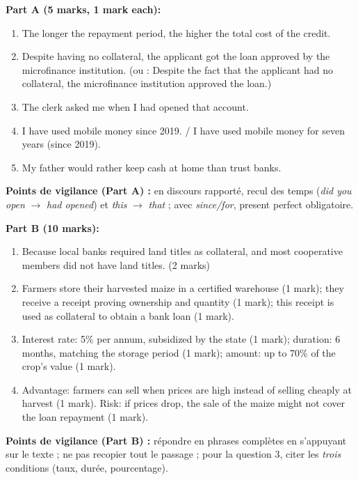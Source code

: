 \documentclass[11pt]{article}
\begin{document}
\begin{corrige}
\textbf{Part A (5 marks, 1 mark each):}
\begin{enumerate}
    \item The longer the repayment period, the higher the total cost of the credit.
    \item Despite having no collateral, the applicant got the loan approved by the microfinance institution. (ou : Despite the fact that the applicant had no collateral, the microfinance institution approved the loan.)
    \item The clerk asked me when I had opened that account.
    \item I have used mobile money since 2019. / I have used mobile money for seven years (since 2019).
    \item My father would rather keep cash at home than trust banks.
\end{enumerate}
\textbf{Points de vigilance (Part A) :} en discours rapporté, recul des temps (\emph{did you open} $\rightarrow$ \emph{had opened}) et \emph{this} $\rightarrow$ \emph{that} ; avec \emph{since/for}, present perfect obligatoire.

\textbf{Part B (10 marks):}
\begin{enumerate}
    \item Because local banks required land titles as collateral, and most cooperative members did not have land titles. (2 marks)
    \item Farmers store their harvested maize in a certified warehouse (1 mark); they receive a receipt proving ownership and quantity (1 mark); this receipt is used as collateral to obtain a bank loan (1 mark).
    \item Interest rate: 5\% per annum, subsidized by the state (1 mark); duration: 6 months, matching the storage period (1 mark); amount: up to 70\% of the crop's value (1 mark).
    \item Advantage: farmers can sell when prices are high instead of selling cheaply at harvest (1 mark). Risk: if prices drop, the sale of the maize might not cover the loan repayment (1 mark).
\end{enumerate}
\textbf{Points de vigilance (Part B) :} répondre en phrases complètes en s'appuyant sur le texte ; ne pas recopier tout le passage ; pour la question 3, citer les \emph{trois} conditions (taux, durée, pourcentage).
\end{corrige}
\end{document}

